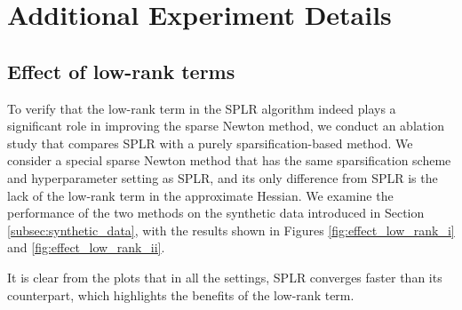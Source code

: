 \documentclass{article}
\theoremstyle{plain}
\theoremstyle{definition}
\theoremstyle{remark}
\begin{document}

\newpage
\appendix
\onecolumn



\section{Additional Experiment Details}

\subsection{Effect of low-rank terms}
To verify that the low-rank term in the SPLR algorithm indeed plays a significant role in improving the sparse Newton method, we conduct an ablation study that compares SPLR with a purely sparsification-based method. We consider a special sparse Newton method that has the same sparsification scheme and hyperparameter setting as SPLR, and its only difference from SPLR is the lack of the low-rank term in the approximate Hessian. We examine the performance of the two methods on the synthetic data introduced in Section \ref{subsec:synthetic_data}, with the results shown in Figures \ref{fig:effect_low_rank_i} and \ref{fig:effect_low_rank_ii}.

It is clear from the plots that in all the settings, SPLR converges faster than its counterpart, which highlights the benefits of the low-rank term.
\end{document}
